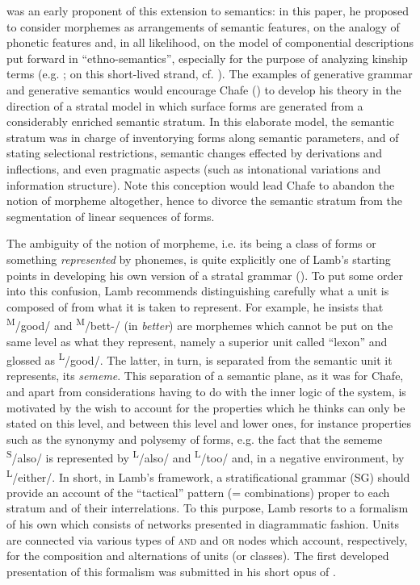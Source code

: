 \documentclass[output=paper]{langscibook}
\begin{document}
\citet{chafe_phonetics_1962} was an early proponent of this extension to semantics: in this paper, he proposed to consider morphemes as arrangements of semantic features, on the analogy of phonetic features and, in all likelihood, on the model of componential descriptions put forward in “ethno-semantics”, especially for the purpose of analyzing kinship terms (e.g. \citealt{lounsbury_semantic_1956}; on this short-lived strand, cf. \citealt{murray_dissolution_1982}). The examples of generative grammar and generative semantics would encourage Chafe (\citealt{chafe_meaning_1970}) to develop his theory in the direction of a stratal model in which surface forms are generated from a considerably enriched semantic stratum. In this elaborate model, the semantic stratum was in charge of inventorying forms along semantic parameters, and of stating selectional restrictions, semantic changes effected by derivations and inflections, and even pragmatic aspects (such as intonational variations and information structure). Note this conception would lead Chafe to abandon the notion of morpheme altogether, hence to divorce the semantic stratum from the segmentation of linear sequences of forms.

The ambiguity of the notion of morpheme, i.e. its being a class of forms or something \textit{represented} by phonemes, is quite explicitly one of Lamb’s starting points in developing his own version of a stratal grammar (\citealt{lamb_sememic_1964}). To put some order into this confusion, Lamb recommends distinguishing carefully what a unit is composed of from what it is taken to represent. For example, he insists that \textsuperscript{M}/good/ and \textsuperscript{M}/bett-/ (in \textit{better}) are morphemes which cannot be put on the same level as what they represent, namely a superior unit called “lexon” and glossed as \textsuperscript{L}/good/. The latter, in turn, is separated from the semantic unit it represents, its \textit{sememe}. This separation of a semantic plane, as it was for Chafe, and apart from considerations having to do with the inner logic of the system, is motivated by the wish to account for the properties which he thinks can only be stated on this level, and between this level and lower ones, for instance properties such as the synonymy and polysemy of forms, e.g. the fact that the sememe \textsuperscript{S}/also/ is represented by \textsuperscript{L}/also/ and \textsuperscript{L}/too/ and, in a negative environment, by \textsuperscript{L}/either/. In short, in Lamb’s framework, a stratificational grammar (SG) should provide an account of the “tactical” pattern (= combinations) proper to each stratum and of their interrelations. To this purpose, Lamb resorts to a formalism of his own which consists of networks presented in diagrammatic fashion. Units are connected via various types of \textsc{and} and \textsc{or} nodes which account, respectively, for the composition and alternations of units (or classes). The first developed presentation of this formalism was submitted in his short opus of \citeyear{lamb_outline_1966}.
\end{document}
